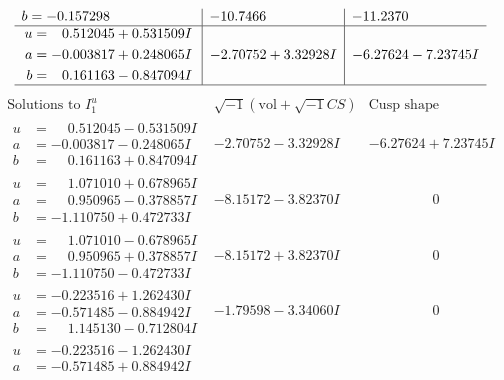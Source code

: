\documentclass[1p]{elsarticle_modified}
\theoremstyle{definition}
\newcommand{\I}{\sqrt{-1}}
\begin{document}
$$\begin{array}{c|c|c}
\begin{aligned}
b &= -0.157298\phantom{ +0.000000I}\end{aligned}
 & -10.7466\phantom{ +0.000000I} & -11.2370\phantom{ +0.000000I} \\ \hline\begin{aligned}
u &= \phantom{-}0.512045 + 0.531509 I \\
a &= -0.003817 + 0.248065 I \\
b &= \phantom{-}0.161163 - 0.847094 I\end{aligned}
 & -2.70752 + 3.32928 I & -6.27624 - 7.23745 I\\
 \hline 
 \end{array}$$\newpage$$\begin{array}{c|c|c}  
\text{Solutions to }I^u_{1}& \I (\text{vol} + \sqrt{-1}CS) & \text{Cusp shape}\\
 \hline 
\begin{aligned}
u &= \phantom{-}0.512045 - 0.531509 I \\
a &= -0.003817 - 0.248065 I \\
b &= \phantom{-}0.161163 + 0.847094 I\end{aligned}
 & -2.70752 - 3.32928 I & -6.27624 + 7.23745 I \\ \hline\begin{aligned}
u &= \phantom{-}1.071010 + 0.678965 I \\
a &= \phantom{-}0.950965 - 0.378857 I \\
b &= -1.110750 + 0.472733 I\end{aligned}
 & -8.15172 - 3.82370 I & \phantom{-0.000000 } 0 \\ \hline\begin{aligned}
u &= \phantom{-}1.071010 - 0.678965 I \\
a &= \phantom{-}0.950965 + 0.378857 I \\
b &= -1.110750 - 0.472733 I\end{aligned}
 & -8.15172 + 3.82370 I & \phantom{-0.000000 } 0 \\ \hline\begin{aligned}
u &= -0.223516 + 1.262430 I \\
a &= -0.571485 - 0.884942 I \\
b &= \phantom{-}1.145130 - 0.712804 I\end{aligned}
 & -1.79598 - 3.34060 I & \phantom{-0.000000 } 0 \\ \hline\begin{aligned}
u &= -0.223516 - 1.262430 I \\
a &= -0.571485 + 0.884942 I \\

\end{aligned}
\end{array}$$
\end{document}
